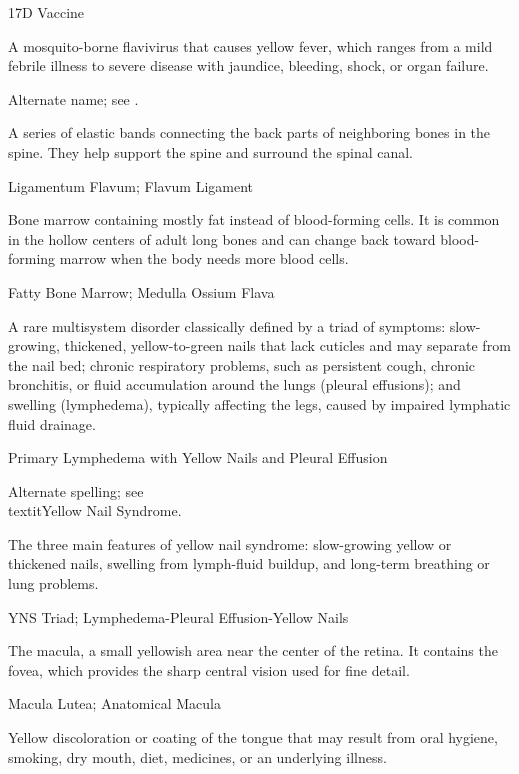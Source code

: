 \synonyms
17D Vaccine

 A mosquito-borne flavivirus that causes yellow fever, which ranges from a mild febrile illness to severe disease with jaundice, bleeding, shock, or organ failure.

 Alternate name; see .

 A series of elastic bands connecting the back parts of neighboring bones in the spine. They help support the spine and surround the spinal canal.

\synonyms
Ligamentum Flavum; Flavum Ligament

 Bone marrow containing mostly fat instead of blood-forming cells. It is common in the hollow centers of adult long bones and can change back toward blood-forming marrow when the body needs more blood cells.

\synonyms
Fatty Bone Marrow; Medulla Ossium Flava

 A rare multisystem disorder classically defined by a triad of symptoms: slow-growing, thickened, yellow-to-green nails that lack cuticles and may separate from the nail bed; chronic respiratory problems, such as persistent cough, chronic bronchitis, or fluid accumulation around the lungs (pleural effusions); and swelling (lymphedema), typically affecting the legs, caused by impaired lymphatic fluid drainage.

\synonyms
Primary Lymphedema with Yellow Nails and Pleural Effusion

 Alternate spelling; see \\textit{Yellow Nail Syndrome}.

 The three main features of yellow nail syndrome: slow-growing yellow or thickened nails, swelling from lymph-fluid buildup, and long-term breathing or lung problems.

\synonyms
YNS Triad; Lymphedema-Pleural Effusion-Yellow Nails

 The macula, a small yellowish area near the center of the retina. It contains the fovea, which provides the sharp central vision used for fine detail.

\synonyms
Macula Lutea; Anatomical Macula

 Yellow discoloration or coating of the tongue that may result from oral hygiene, smoking, dry mouth, diet, medicines, or an underlying illness.

